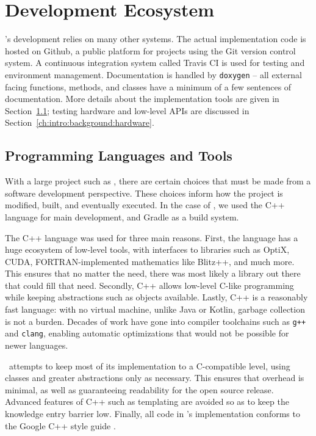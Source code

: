 \section{Development Ecosystem}
\label{ch:intro:background:development_ecosystem}

\name's development relies on many other systems.
The actual implementation code is hosted on Github, a public platform for projects using the Git version control system.
A continuous integration system called Travis CI \cite{travisci} is used for testing and environment management.
Documentation is handled by \texttt{doxygen} \cite{van2008doxygen} -- all external facing functions, methods, and classes have a minimum of a few sentences of documentation.
More details about the implementation tools are given in Section~\ref{ch:intro:background:languages_and_libraries}; testing hardware and low-level APIs are discussed in Section~\ref{ch:intro:background:hardware}.

\subsection{Programming Languages and Tools}
\label{ch:intro:background:languages_and_libraries}

With a large project such as \name, there are certain choices that must be made from a software development perspective.
These choices inform how the project is modified, built, and eventually executed.
In the case of \name, we used the C++ language \cite{cpp14standard} for main development, and Gradle \cite{gradle} as a build system.


The C++ language was used for three main reasons.
First, the language has a huge ecosystem of low-level tools, with interfaces to libraries such as OptiX, CUDA, FORTRAN-implemented mathematics like Blitz++, and much more.
This ensures that no matter the need, there was most likely a library out there that could fill that need.
Secondly, C++ allows low-level C-like programming while keeping abstractions such as objects available.
Lastly, C++ is a reasonably fast language: with no virtual machine, unlike Java or Kotlin, garbage collection is not a burden.
Decades of work have gone into compiler toolchains such as \texttt{g++} and \texttt{clang}, enabling automatic optimizations that would not be possible for newer languages.

\name\ attempts to keep most of its implementation to a C-compatible level, using classes and greater abstractions only as necessary.
This ensures that overhead is minimal, as well as guaranteeing readability for the open source release.
Advanced features of C++ such as templating are avoided so as to keep the knowledge entry barrier low.
Finally, all code in \name's implementation conforms to the Google C++ style guide \cite{googleStyleGuide}.

